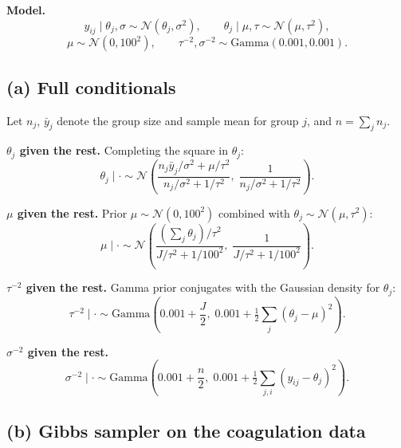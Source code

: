 \documentclass[
  letterpaper,
  DIV=11,
  numbers=noendperiod]{scrartcl}
\begin{document}
\textbf{Model.} \[
y_{ij} \mid \theta_j, \sigma \sim \mathcal{N}(\theta_j, \sigma^2), \qquad \theta_j \mid \mu, \tau \sim \mathcal{N}(\mu, \tau^2),
\] \[
\mu \sim \mathcal{N}(0, 100^2), \qquad \tau^{-2}, \sigma^{-2} \sim \text{Gamma}(0.001, 0.001).
\]

\subsection{(a) Full conditionals}\label{a-full-conditionals-1}

Let \(n_j\), \(\bar y_j\) denote the group size and sample mean for
group \(j\), and \(n = \sum_j n_j\).

\textbf{\(\theta_j\) given the rest.} Completing the square in
\(\theta_j\): \[
\theta_j \mid \cdot \sim \mathcal N\!\left(\frac{n_j \bar y_j/\sigma^2 + \mu/\tau^2}{n_j/\sigma^2 + 1/\tau^2},\; \frac{1}{n_j/\sigma^2 + 1/\tau^2}\right).
\]

\textbf{\(\mu\) given the rest.} Prior
\(\mu \sim \mathcal{N}(0, 100^2)\) combined with
\(\theta_j \sim \mathcal N(\mu, \tau^2)\): \[
\mu \mid \cdot \sim \mathcal{N}\!\left(\frac{(\sum_j \theta_j)/\tau^2}{J/\tau^2 + 1/100^2},\; \frac{1}{J/\tau^2 + 1/100^2}\right).
\]

\textbf{\(\tau^{-2}\) given the rest.} Gamma prior conjugates with the
Gaussian density for \(\theta_j\): \[
\tau^{-2} \mid \cdot \sim \text{Gamma}\!\left(0.001 + \frac{J}{2},\; 0.001 + \tfrac{1}{2}\sum_j (\theta_j - \mu)^2\right).
\]

\textbf{\(\sigma^{-2}\) given the rest.} \[
\sigma^{-2} \mid \cdot \sim \text{Gamma}\!\left(0.001 + \frac{n}{2},\; 0.001 + \tfrac{1}{2} \sum_{j,i} (y_{ij} - \theta_j)^2\right).
\]

\subsection{(b) Gibbs sampler on the coagulation
data}\label{b-gibbs-sampler-on-the-coagulation-data}
\end{document}
